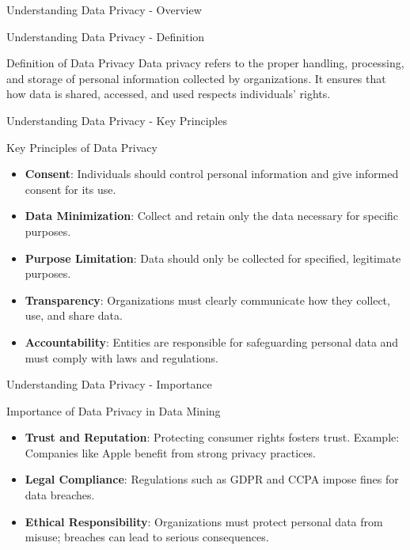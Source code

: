 \documentclass[aspectratio=169]{beamer}
\begin{document}
\begin{frame}[fragile]{Understanding Data Privacy - Overview}
  \tableofcontents[hideallsubsections]
\end{frame}

\begin{frame}[fragile]{Understanding Data Privacy - Definition}
    \begin{block}{Definition of Data Privacy}
        Data privacy refers to the proper handling, processing, and storage of personal information collected by organizations. It ensures that how data is shared, accessed, and used respects individuals' rights.
    \end{block}
\end{frame}

\begin{frame}[fragile]{Understanding Data Privacy - Key Principles}
    \begin{block}{Key Principles of Data Privacy}
        \begin{itemize}
            \item \textbf{Consent}: Individuals should control personal information and give informed consent for its use.
            \item \textbf{Data Minimization}: Collect and retain only the data necessary for specific purposes.
            \item \textbf{Purpose Limitation}: Data should only be collected for specified, legitimate purposes.
            \item \textbf{Transparency}: Organizations must clearly communicate how they collect, use, and share data.
            \item \textbf{Accountability}: Entities are responsible for safeguarding personal data and must comply with laws and regulations.
        \end{itemize}
    \end{block}
\end{frame}

\begin{frame}[fragile]{Understanding Data Privacy - Importance}
    \begin{block}{Importance of Data Privacy in Data Mining}
        \begin{itemize}
            \item \textbf{Trust and Reputation}: Protecting consumer rights fosters trust. Example: Companies like Apple benefit from strong privacy practices.
            \item \textbf{Legal Compliance}: Regulations such as GDPR and CCPA impose fines for data breaches.
            \item \textbf{Ethical Responsibility}: Organizations must protect personal data from misuse; breaches can lead to serious consequences.
        \end{itemize}
    \end{block}
\end{frame}
\end{document}
